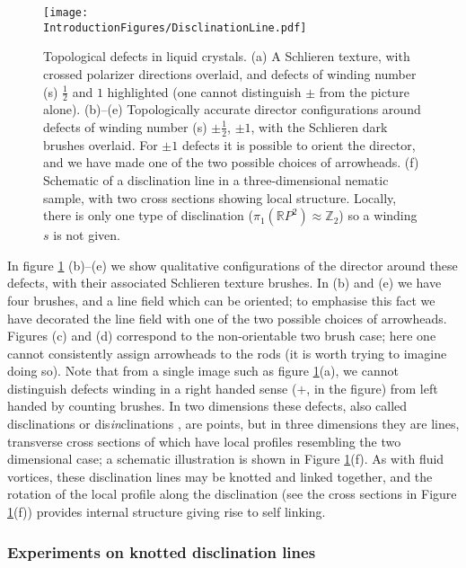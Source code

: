 \begin{figure}[htbp]
\centering
\texttt{[image: \\IntroductionFigures/DisclinationLine.pdf]}
\caption{Topological defects in liquid crystals. (a) A Schlieren texture, with crossed polarizer directions overlaid, and defects of winding number (s) $\frac{1}{2}$ and $1$ highlighted (one cannot distinguish $\pm$ from the picture alone). (b)--(e) Topologically accurate director configurations around defects of winding number (s) $\pm \frac{1}{2}$, $\pm1$, with the Schlieren dark brushes overlaid. For $\pm1$ defects it is possible to orient the director, and we have made one of the two possible choices of arrowheads. (f) Schematic of a disclination line in a three-dimensional nematic sample, with two cross sections showing local structure. Locally, there is only one type of disclination ($\pi_1(\mathbb{R}P^2) \approx \mathbb{Z}_2$) so a winding $s$ is not given.}
\label{fig:Disclination}
\end{figure}
In figure \ref{fig:Disclination} (b)--(e) we show qualitative configurations of the director around these defects, with their associated Schlieren texture brushes. In (b) and (e) we have four brushes, and a line field which can be oriented; to emphasise this fact we have decorated the line field with one of the two possible choices of arrowheads. Figures (c) and (d) correspond to the non-orientable two brush case; here one cannot consistently assign arrowheads to the rods (it is worth trying to imagine doing so). Note that from a single image such as figure \ref{fig:Disclination}(a), we cannot distinguish defects winding in a right handed sense ($+$, in the figure) from left handed by counting brushes.  In two dimensions these defects, also called disclinations or dis\emph{in}clinations \citep{Frank1958}, are points, but in three dimensions they are lines, transverse cross sections of which have local profiles resembling the two dimensional case; a schematic illustration is shown in Figure \ref{fig:Disclination}(f). As with fluid vortices, these disclination lines may be knotted and linked together, and the rotation of the local profile along the disclination (see the cross sections in Figure \ref{fig:Disclination}(f)) provides internal structure giving rise to self linking.

\subsubsection{Experiments on knotted disclination lines}

